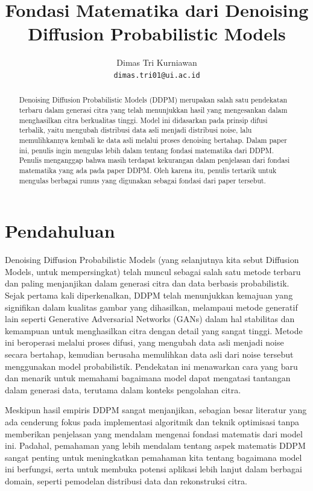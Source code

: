 \documentclass{article}
\title{Fondasi Matematika dari Denoising Diffusion Probabilistic Models}
\author{
	Dimas Tri Kurniawan\\
	\texttt{dimas.tri01@ui.ac.id}
}
\begin{document}
\maketitle


\begin{abstract}
Denoising Diffusion Probabilistic Models (DDPM) merupakan salah satu pendekatan terbaru dalam generasi citra yang telah menunjukkan hasil yang mengesankan dalam menghasilkan citra berkualitas tinggi. Model ini didasarkan pada prinsip difusi terbalik, yaitu mengubah distribusi data asli menjadi distribusi noise, lalu memulihkannya kembali ke data asli melalui proses denoising bertahap. Dalam paper ini, penulis ingin mengulas lebih dalam tentang fondasi matematika dari DDPM. Penulis menganggap bahwa masih terdapat kekurangan dalam penjelasan dari fondasi matematika yang ada pada paper DDPM. Oleh karena itu, penulis tertarik untuk mengulas berbagai rumus yang digunakan sebagai fondasi dari paper tersebut.
\end{abstract}


\section{Pendahuluan}


Denoising Diffusion Probabilistic Models (yang selanjutnya kita sebut Diffusion Models, untuk mempersingkat) telah muncul sebagai salah satu metode terbaru dan paling menjanjikan dalam generasi citra dan data berbasis probabilistik. Sejak pertama kali diperkenalkan, DDPM telah menunjukkan kemajuan yang signifikan dalam kualitas gambar yang dihasilkan, melampaui metode generatif lain seperti Generative Adversarial Networks (GANs) dalam hal stabilitas dan kemampuan untuk menghasilkan citra dengan detail yang sangat tinggi. Metode ini beroperasi melalui proses difusi, yang mengubah data asli menjadi noise secara bertahap, kemudian berusaha memulihkan data asli dari noise tersebut menggunakan model probabilistik. Pendekatan ini menawarkan cara yang baru dan menarik untuk memahami bagaimana model dapat mengatasi tantangan dalam generasi data, terutama dalam konteks pengolahan citra.

Meskipun hasil empiris DDPM sangat menjanjikan, sebagian besar literatur yang ada cenderung fokus pada implementasi algoritmik dan teknik optimisasi tanpa memberikan penjelasan yang mendalam mengenai fondasi matematis dari model ini. Padahal, pemahaman yang lebih mendalam tentang aspek matematis DDPM sangat penting untuk meningkatkan pemahaman kita tentang bagaimana model ini berfungsi, serta untuk membuka potensi aplikasi lebih lanjut dalam berbagai domain, seperti pemodelan distribusi data dan rekonstruksi citra.
\end{document}
